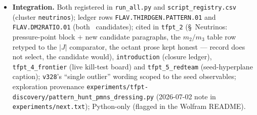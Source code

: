 \begin{itemize}
(\texttt{v9}/\texttt{v268}/\texttt{v270}, $\delta{=}4\pi/3$) has one canonical derived CP invariant, and
\textbf{[N]} $|J_{\mathrm{PMNS}}|{=}0.029653$ meets the NuFIT~6.0 measured ratio $0.029805\pm0.000792$ at
$-0.19\sigma$ (equivalently $m_2/m_3{=}\sqrt{|J|}{=}0.17220$ vs $0.17264(229)$) --- zero dials.
\textbf{[N]} the informal \texttt{tfpt\_2} table heuristic $m_2/m_3{\sim}\pi\varphi_0{=}0.16704$ (a ``$\sim$''
entry, never frozen) is now $-2.44\sigma$ and is \emph{superseded as the comparator}. \textbf{[C]} spectrum
consistency: $\Sigma m_\nu{=}m_3(1{+}\sqrt{|J|}){=}0.0588$ eV reproduces the documented $0.0586$ eV
(\texttt{v272}); no absolute number is added. \textbf{[O]} no mechanism (the $\mu\tau$ texture gives
$\theta_{13}{=}0$ at leading order). \textbf{[X]} JUNO shrinks the window ${\sim}4\times$; adopting the
\texttt{v467} pattern would shift $|J|\to0.028849$ ($-1.21\sigma$ today) --- the two candidates
\emph{cross-discriminate} at JUNO precision. Python-only.
\item \textbf{Integration.} Both registered in \texttt{run\_all.py} and \texttt{script\_registry.csv}
(cluster \texttt{neutrinos}); ledger rows \texttt{FLAV.THIRDGEN.PATTERN.01} and \texttt{FLAV.DM2RATIO.01}
(both \mO\ candidates); cited in \texttt{tfpt\_2} (\S~Neutrinos: pressure-point block $+$ new candidate
paragraphs, the $m_2/m_3$ table row retyped to the $|J|$ comparator, the octant prose kept honest ---
record does not select, the candidate would), \texttt{introduction} (closure ledger), \texttt{tfpt\_4\_frontier}
(live kill-test board) and \texttt{tfpt\_5\_redteam} (seed-hyperplane caption); \texttt{v328}'s
``single outlier'' wording scoped to the seed observables; exploration provenance
\texttt{experiments/tfpt-discovery/pattern\_hunt\_pmns\_dressing.py} (2026-07-02 note in
\texttt{experiments/next.txt}); Python-only (flagged in the Wolfram README).
\end{itemize}

